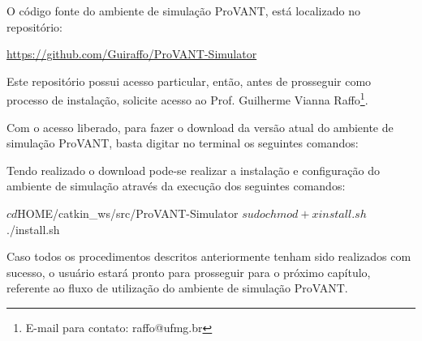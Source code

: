O código fonte do ambiente de simulação ProVANT, está localizado no repositório: 

\begin{center}
\url{https://github.com/Guiraffo/ProVANT-Simulator}
\end{center}

\noindent Este repositório possui acesso particular, então, antes de prosseguir como processo de instalação, solicite acesso ao Prof. Guilherme Vianna Raffo\footnote{E-mail para contato: raffo@ufmg.br}.

Com o acesso liberado, para fazer o download da versão atual do ambiente de simulação ProVANT, basta digitar no terminal os seguintes comandos:


Tendo realizado o download pode-se realizar a instalação e configuração do ambiente de simulação através da execução dos seguintes comandos:

\begin{bashcode}
$ cd $HOME/catkin_ws/src/ProVANT-Simulator
$ sudo chmod +x install.sh
$ ./install.sh
\end{bashcode}


Caso todos os procedimentos descritos anteriormente tenham sido realizados com sucesso, o usuário estará pronto para prosseguir para o próximo capítulo, referente ao fluxo de utilização do ambiente de simulação ProVANT.